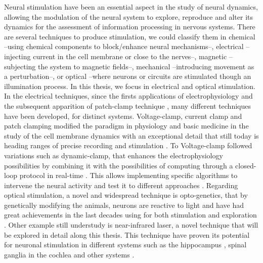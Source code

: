 Neural stimulation have been an essential aspect in the study of neural dynamics, allowing the modulation of the neural system to explore, reproduce and alter its dynamics for the assessment of information processing in nervous systems. There are several techniques to produce  stimulation, we could classify them in chemical --using chemical components to block/enhance neural mechanisms--, electrical --injecting current in the cell membrane or close to the nerves--, magnetic --subjecting the system to magnetic fields--, mechanical --introducing movement as a perturbation--,  or optical --where neurons or circuits are stimulated though an illumination process. In this thesis, we focus in electrical and optical stimulation. In the electrical techniques, since the firsts applications of electrophysiology  \parencite{marmont_studies_1949,cole_ions_1955,neher_singlechannel_1976} and the subsequent apparition of patch-clamp technique \parencite{hamill_improved_1981}, many different techniques have been developed, for distinct systems. Voltage-clamp, current clamp and patch clamping modified the paradigm in physiology and basic medicine in the study of the cell membrane dynamics with an exceptional detail that still today is heading ranges of precise recording and stimulation \parencite{hamill_improved_1981}. To Voltage-clamp followed variations such as dynamic-clamp, that enhances the electrophysiology possibilities by combining it with the possibilities of computing through a closed-loop protocol in real-time \parencite{nowotny_dynamic_2022}. This allows implementing specific algorithms to intervene the neural activity and test it to different approaches \parencite{chamorro_generalization_2012}. 
Regarding optical stimulation, a novel and widespread technique is opto-genetics, that by genetically modifying the animals, neurons are reactive to light and have had great achievements in the last decades using for both stimulation and exploration \parencite{chen_roles_2022}. Other example still understudy is near-infrared laser, a novel technique that will be explored in detail along this thesis. This technique have proven its potential for neuronal stimulation in different systems such as the hippocampus \parencite{liang_temperaturedependent_2009}, spinal ganglia in the cochlea \parencite{goyal_acute_2012, barrett_pulsed_2018, brown_thermal_2020} and other systems \parencite{shapiro_infrared_2012, cayce_infrared_2014, begeng_activity_2022}.

%

